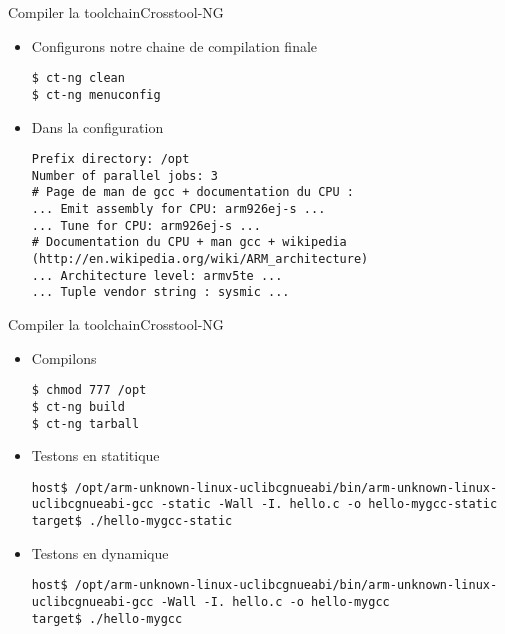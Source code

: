\begin{frame}[fragile=singleslide]{Compiler la toolchain}{Crosstool-NG}
  \begin{itemize}
  \item Configurons notre chaine de compilation finale
    \begin{lstlisting}
$ ct-ng clean 
$ ct-ng menuconfig
       \end{lstlisting}
     \item Dans la configuration
       \begin{lstlisting}
Prefix directory: /opt
Number of parallel jobs: 3
# Page de man de gcc + documentation du CPU :
... Emit assembly for CPU: arm926ej-s ...
... Tune for CPU: arm926ej-s ...
# Documentation du CPU + man gcc + wikipedia (http://en.wikipedia.org/wiki/ARM_architecture)
... Architecture level: armv5te ...
... Tuple vendor string : sysmic ...
       \end{lstlisting}
  \end{itemize}
\end{frame}

\begin{frame}[fragile=singleslide]{Compiler la toolchain}{Crosstool-NG}
  \begin{itemize}
     \item Compilons
       \begin{lstlisting}
$ chmod 777 /opt
$ ct-ng build
$ ct-ng tarball
       \end{lstlisting}
     \item Testons en statitique
       \begin{lstlisting}[basicstyle=\ttfamily\scriptsize\color{colBasic}]
host$ /opt/arm-unknown-linux-uclibcgnueabi/bin/arm-unknown-linux-uclibcgnueabi-gcc -static -Wall -I. hello.c -o hello-mygcc-static
target$ ./hello-mygcc-static
       \end{lstlisting}
     \item Testons en dynamique
       \begin{lstlisting}[basicstyle=\ttfamily\scriptsize\color{colBasic}]
host$ /opt/arm-unknown-linux-uclibcgnueabi/bin/arm-unknown-linux-uclibcgnueabi-gcc -Wall -I. hello.c -o hello-mygcc
target$ ./hello-mygcc
	\end{lstlisting}
  \end{itemize}
\end{frame}

